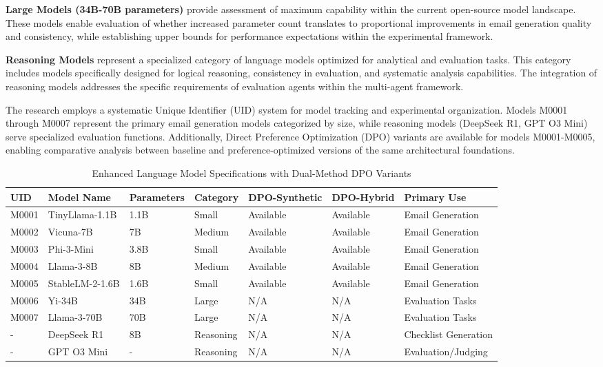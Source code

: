 \textbf{Large Models (34B-70B parameters)} provide assessment of maximum capability within the current open-source model landscape. These models enable evaluation of whether increased parameter count translates to proportional improvements in email generation quality and consistency, while establishing upper bounds for performance expectations within the experimental framework.

\textbf{Reasoning Models} represent a specialized category of language models optimized for analytical and evaluation tasks. This category includes models specifically designed for logical reasoning, consistency in evaluation, and systematic analysis capabilities. The integration of reasoning models addresses the specific requirements of evaluation agents within the multi-agent framework.

The research employs a systematic Unique Identifier (UID) system for model tracking and experimental organization. Models M0001 through M0007 represent the primary email generation models categorized by size, while reasoning models (DeepSeek R1, GPT O3 Mini) serve specialized evaluation functions. Additionally, Direct Preference Optimization (DPO) variants are available for models M0001-M0005, enabling comparative analysis between baseline and preference-optimized versions of the same architectural foundations.

\begin{table}[htbp]
    \centering
    \caption{Enhanced Language Model Specifications with Dual-Method DPO Variants}
    \label{tab:model-specifications}
    \begin{tabular}{|l|l|l|l|l|l|l|}
    \hline
    \textbf{UID} & \textbf{Model Name} & \textbf{Parameters} & \textbf{Category} & \textbf{DPO-Synthetic} & \textbf{DPO-Hybrid} & \textbf{Primary Use} \\
    \hline
    M0001 & TinyLlama-1.1B & 1.1B & Small & Available & Available & Email Generation \\
    M0002 & Vicuna-7B & 7B & Medium & Available & Available & Email Generation \\
    M0003 & Phi-3-Mini & 3.8B & Small & Available & Available & Email Generation \\
    M0004 & Llama-3-8B & 8B & Medium & Available & Available & Email Generation \\
    M0005 & StableLM-2-1.6B & 1.6B & Small & Available & Available & Email Generation \\
    M0006 & Yi-34B & 34B & Large & N/A & N/A & Evaluation Tasks \\
    M0007 & Llama-3-70B & 70B & Large & N/A & N/A & Evaluation Tasks \\
    - & DeepSeek R1 & 8B & Reasoning & N/A & N/A & Checklist Generation \\
    - & GPT O3 Mini & - & Reasoning & N/A & N/A & Evaluation/Judging \\
    \hline
    \end{tabular}
\end{table}

